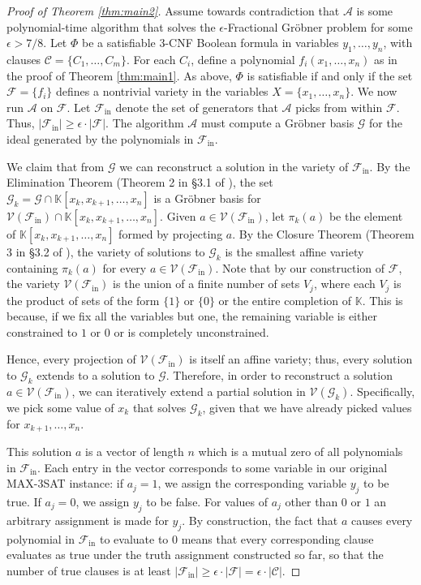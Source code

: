 \documentclass{article}
\newcommand{\F}[0]{\mathcal{F}}
\newcommand{\C}[0]{\mathcal{C}}
\newcommand{\Fin}[0]{\mathcal{F}_\text{in}}
\newcommand{\G}[0]{\mathcal{G}}
\newcommand{\A}[0]{\mathcal{A}}
\newcommand{\V}[0]{\mathcal{V}}
\newcommand{\K}[0]{\mathbb{K}}
\newcommand{\ep}[0]{\epsilon}
\begin{document}
\begin{proof}[Proof of Theorem \ref{thm:main2}]
Assume towards contradiction that $\A$ is some polynomial-time algorithm that solves the $\ep$\nobreakdash-Fractional Gr\"obner problem for some $\ep > 7/8$.  Let $\Phi$ be a satisfiable 3\nobreakdash-CNF Boolean formula in variables $y_1,\ldots,y_n$, with clauses $\C = \{C_1, \ldots, C_m\}$. For each $C_i$, define a polynomial $f_i(x_1,\ldots,x_n)$ as in the proof of Theorem \ref{thm:main1}. As above, $\Phi$ is satisfiable if and only if the set $\F = \{f_i\}$ defines a nontrivial variety in the variables $X = \{x_1, \ldots, x_n\}$. We now run $\A$ on $\F$. Let $\Fin$ denote the set of generators that $\A$ picks from within $\F$.  Thus, $|\Fin| \ge \ep \cdot |\F|$. The algorithm $\A$ must compute a Gr\"{o}bner basis $\G$ for the ideal generated by the polynomials in $\Fin$.

We claim that from $\G$ we can reconstruct a solution in the variety of $\Fin$.  By the Elimination Theorem (Theorem 2 in \S3.1 of \cite{cox}), the set $\G_k = \G\cap \K[x_k, x_{k+1}, \ldots, x_n]$ is a Gr\"obner basis for $\V(\Fin) \cap \K[x_k, x_{k+1}, \ldots, x_n]$. Given $a\in \V(\Fin)$, let $\pi_k(a)$ be the element of $\K[x_k, x_{k+1}, \ldots, x_n]$ formed by projecting $a$. By the Closure Theorem (Theorem 3 in \S3.2 of \cite{cox}), the variety of solutions to $\G_k$ is the smallest affine variety containing $\pi_k(a)$ for every $a\in \V(\Fin)$. Note that by our construction of $\F$, the variety $\V(\Fin)$ is the union of a finite number of sets $V_j$, where each $V_j$ is the product of sets of the form $\{1\}$ or $\{0\}$ or the entire completion of $\K$.  This is because, if we fix all the variables but one, the remaining variable is either constrained to $1$ or $0$ or is completely unconstrained.

Hence, every projection of $\V(\Fin)$ is itself an affine variety; thus, every solution to $\G_k$ extends to a solution to $\G$. Therefore, in order to reconstruct a solution $a\in \V(\Fin)$, we can iteratively extend a partial solution in $\V(\G_k)$. Specifically, we pick some value of $x_k$ that solves $\G_k$, given that we have already picked values for $x_{k+1}, \ldots, x_n$.

This solution $a$ is a vector of length $n$ which is a mutual zero of all polynomials in $\Fin$. Each entry in the vector corresponds to some variable in our original MAX\nobreakdash-3SAT instance: if $a_j = 1$, we assign the corresponding variable $y_j$ to be true. If $a_j = 0$, we assign $y_j$ to be false. For values of $a_j$ other than $0$ or $1$ an arbitrary assignment is made for $y_j$. By construction, the fact that $a$ causes every polynomial in $\Fin$ to evaluate to 0 means that every corresponding clause evaluates as true under the truth assignment constructed so far, so that the number of true clauses is at least $|\Fin| \ge \ep\cdot |\F| = \ep \cdot |\C|$.


\end{proof}
\end{document}
